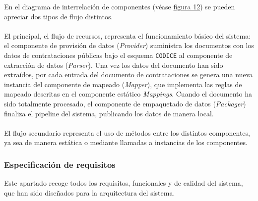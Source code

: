             En el diagrama de interrelación de componentes (véase \hyperref[fig:componentes]{figura 12}) se pueden apreciar dos tipos de flujo distintos.
            \\ \\
            El principal, el flujo de recursos, representa el funcionamiento básico del sistema: el componente de provisión de datos (\textit{Provider}) suministra los documentos con los datos de contrataciones públicas bajo el esquema \texttt{CODICE} al componente de extracción de datos (\textit{Parser}). Una vez los datos del documento han sido extraídos, por cada entrada del documento de contrataciones se genera una nueva instancia del componente de mapeado (\textit{Mapper}), que implementa las reglas de mapeado descritas en el componente estático \textit{Mappings}. Cuando el documento ha sido totalmente procesado, el componente de empaquetado de datos (\textit{Packager}) finaliza el pipeline del sistema, publicando los datos de manera local.
            \\ \\
            El flujo secundario representa el uso de métodos entre los distintos componentes, ya sea de manera estática o mediante llamadas a instancias de los componentes.
            
        \subsubsection{Especificación de requisitos}
            Este apartado recoge todos los requisitos, funcionales y de calidad del sistema, que han sido diseñados para la arquitectura del sistema.

